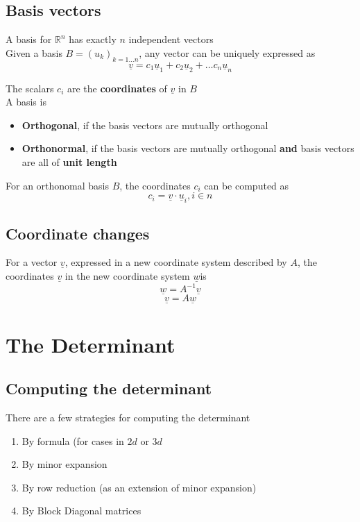 \subsection{Basis vectors} 
\begin{framed}
   A basis for $ \mathbb{R}^n$ has exactly $n$ independent vectors \\

   Given a basis $B = \left(u_k \right)_{k = 1 \hdots n}$, any vector can be uniquely expressed as \[
     \underline{v} = c_1 \underline{u}_1 + c_2 \underline{u}_2 + \hdots c_n \underline{u}_n
   \] 

   The scalars ${c_i}$ are the \textbf{coordinates} of $ \underline{v}$ in $B$ \\

   A basis is 
   \begin{itemize}
      \item \textbf{Orthogonal}, if the basis vectors are mutually orthogonal
      \item \textbf{Orthonormal}, if the basis vectors are mutually orthogonal \textbf{and} basis vectors are all of \textbf{unit length}
   \end{itemize}


   For an orthonomal basis $B$, the coordinates $c_i$ can be computed as \[
     c_i = \underline{v} \cdot \underline{u}_i, i \in n
   \] 
\end{framed}

\subsection{Coordinate changes}
\begin{framed}
   For a vector $ \underline{v} $, expressed in a new coordinate system described by $A$, the coordinates $ \underline{v}$ in the new coordinate system $ \underline{w}$is \[
      \underline{w} = A^{-1} \underline{v}
   \]  
   \[
     \underline{v} = A \underline{w}
   \] 
  
\end{framed}

\section{The Determinant}

\subsection{Computing the determinant}
There are a few strategies for computing the determinant
\begin{enumerate}
   \item By formula (for cases in $2d$ or $3d$
   \item By minor expansion
   \item By row reduction (as an extension of minor expansion)
   \item By Block Diagonal matrices
\end{enumerate}

